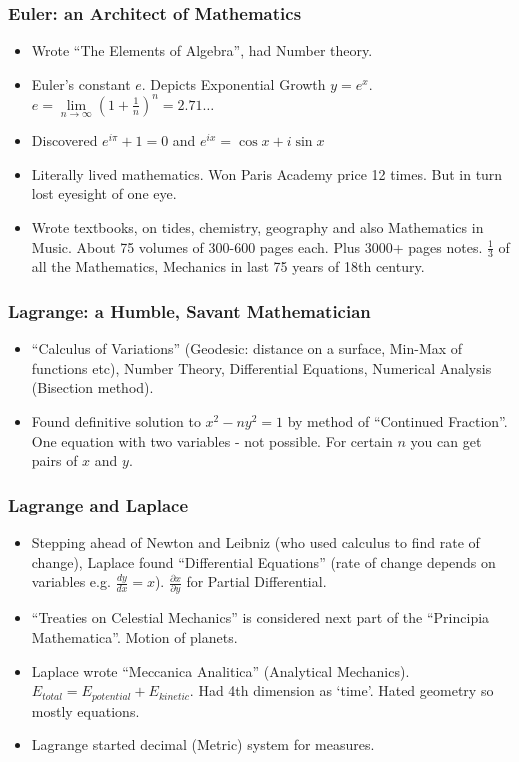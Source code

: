 \begin{frame}[fragile]
\frametitle{Euler: an Architect of Mathematics}
\begin{itemize}
\item Wrote ``The Elements of Algebra'', had Number theory.
\item Euler's constant $e$. Depicts Exponential Growth $y=e^x$. $e= \lim \limits_{n \to \infty} (1+\frac{1}{n})^n =2.71\ldots$
\item Discovered $e^{i \pi}+1=0$ and $e^{ix}=\cos{x} + i\sin{x}$
\item Literally lived mathematics. Won Paris Academy price 12 times. But in turn lost eyesight of one eye.
\item Wrote textbooks, on tides, chemistry, geography and also Mathematics in Music. About 75 volumes of 300-600 pages each. Plus 3000+ pages notes. $\frac{1}{3}$ of all the Mathematics, Mechanics in last 75 years of 18th century.
\end{itemize}
\end{frame}


\begin{frame}[fragile]
\frametitle{Lagrange: a Humble, Savant Mathematician}
\begin{itemize}
\item ``Calculus of Variations'' (Geodesic: distance on a surface, Min-Max of functions etc), Number Theory, Differential Equations, Numerical Analysis (Bisection method).
\item Found definitive solution to $x^2-ny^2=1$ by method of ``Continued Fraction''. One equation with two variables - not possible. For certain $n$ you can get pairs of $x$ and $y$.
\end{itemize}
\end{frame}

\begin{frame}[fragile]
\frametitle{Lagrange and Laplace}
\begin{itemize}
\item Stepping ahead of Newton and Leibniz (who used calculus to find rate of change), Laplace found ``Differential Equations'' (rate of change depends on variables e.g. $\frac{dy}{dx}=x$). $\frac{\partial x}{\partial y}$ for Partial Differential.
\item ``Treaties on Celestial Mechanics'' is considered next part of the ``Principia Mathematica''. Motion of planets.
\item Laplace wrote ``Meccanica Analitica'' (Analytical Mechanics). $E_{total} = E_{potential} + E_{kinetic}$. Had 4th dimension as `time'. Hated geometry so mostly equations.
\item Lagrange started decimal (Metric) system for measures.
\end{itemize}
\end{frame}

